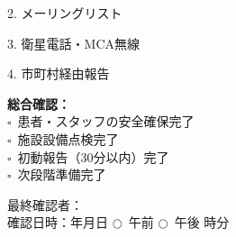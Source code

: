 \documentclass[a4paper,12pt]{jarticle}
\newcommand{\checkbox}{$\square$\ }
\newcommand{\underlinespace}[1]{\underline{\hspace{#1}}}
\newcommand{\circlecheck}{$\bigcirc$\ }
\begin{document}
2. メーリングリスト

3. 衛星電話・MCA無線

4. 市町村経由報告

\vspace{5mm}

\noindent
\textbf{総合確認：} \\
\checkbox 患者・スタッフの安全確保完了 \\
\checkbox 施設設備点検完了 \\
\checkbox 初動報告（30分以内）完了 \\
\checkbox 次段階準備完了

\vspace{5mm}

\noindent
最終確認者：\underlinespace{4cm} \\
\vspace{3mm}
確認日時：\underlinespace{2cm}年\underlinespace{1cm}月\underlinespace{1cm}日 \quad \circlecheck 午前 \quad \circlecheck 午後 \quad \underlinespace{1cm}時\underlinespace{1cm}分
\end{document}
